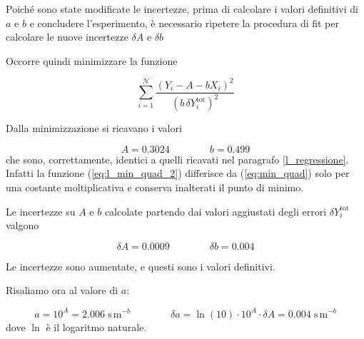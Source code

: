 Poiché sono state modificate le incertezze, prima di calcolare i valori definitivi di $a$ e $b$ e concludere l'esperimento,
è necessario ripetere la procedura di fit per calcolare le nuove incertezze $\delta A$ e $\delta b$

Occorre quindi minimizzare la funzione

\begin{equation}
    \sum_{i=1}^\mathcal{N} \frac{(Y_i - A - bX_i)^2}{(b\,\delta Y_i^{\text{tot}})^2}
    \label{eq:l_min_quad_2}
\end{equation}

Dalla minimizzazione si ricavano i valori

\begin{equation*}
    A = 0.3024 \qquad \qquad b = 0.499
\end{equation*}
%
che sono, correttamente, identici a quelli ricavati nel paragrafo \ref{l_regressione}.
Infatti la funzione (\ref{eq:l_min_quad_2}) differisce da (\ref{eq:min_quad}) solo per una costante
moltiplicativa e conserva inalterati il punto di minimo.

Le incertezze su $A$ e $b$ calcolate partendo dai valori aggiustati degli errori $\delta Y_i^{\text{tot}}$
valgono

\begin{equation*}
    \delta A = 0.0009 \qquad \qquad \delta b = 0.004
\end{equation*}

Le incertezze sono aumentate, e questi sono i valori definitivi.

Risaliamo ora al valore di $a$:

\begin{equation}
    a = 10^A = 2.006 \; \text{s}\,\text{m}^{-b} \qquad \qquad \delta a = \ln(10) \cdot 10^A \cdot \delta A = 0.004 \; \text{s}\,\text{m}^{-b}
\end{equation}
%
dove $\ln$ è il logaritmo naturale.
